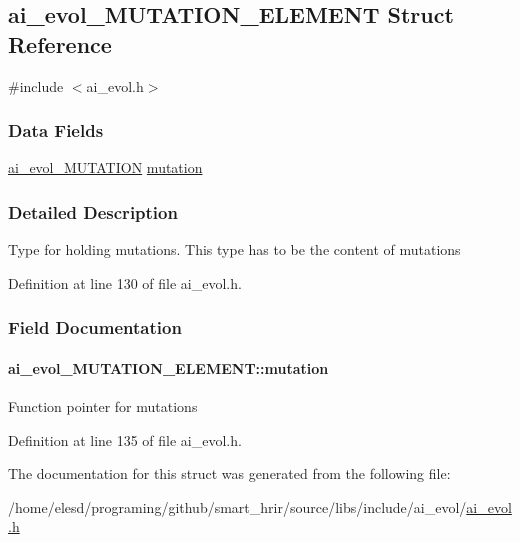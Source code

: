 \hypertarget{a00002}{\subsection{ai\-\_\-evol\-\_\-\-M\-U\-T\-A\-T\-I\-O\-N\-\_\-\-E\-L\-E\-M\-E\-N\-T Struct Reference}
\label{a00002}
}


{\ttfamily \#include $<$ai\-\_\-evol.\-h$>$}

\subsubsection*{Data Fields}
\begin{DoxyCompactItemize}
\item 
\hyperlink{a00008_a396a21836c00e192def7ee47518bd001}{ai\-\_\-evol\-\_\-\-M\-U\-T\-A\-T\-I\-O\-N} \hyperlink{a00002_a779a0a1edc16cb1709054860efd5b6a5}{mutation}
\end{DoxyCompactItemize}


\subsubsection{Detailed Description}
Type for holding mutations. This type has to be the content of mutations 

Definition at line 130 of file ai\-\_\-evol.\-h.



\subsubsection{Field Documentation}
\hypertarget{a00002_a779a0a1edc16cb1709054860efd5b6a5}{
\paragraph[{mutation}]{ ai\-\_\-evol\-\_\-\-M\-U\-T\-A\-T\-I\-O\-N\-\_\-\-E\-L\-E\-M\-E\-N\-T\-::mutation}}\label{a00002_a779a0a1edc16cb1709054860efd5b6a5}
Function pointer for mutations 

Definition at line 135 of file ai\-\_\-evol.\-h.



The documentation for this struct was generated from the following file\-:\begin{DoxyCompactItemize}
\item 
/home/elesd/programing/github/smart\-\_\-hrir/source/libs/include/ai\-\_\-evol/\hyperlink{a00008}{ai\-\_\-evol.\-h}\end{DoxyCompactItemize}
